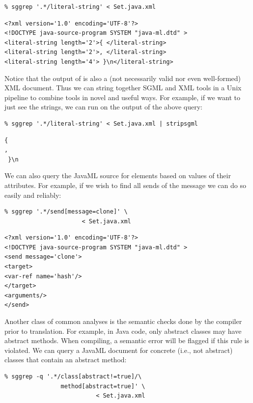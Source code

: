 \documentclass{article}
\begin{document}
{\bfseries
\begin{verbatim}
% sggrep '.*/literal-string' < Set.java.xml
\end{verbatim}
}
{\small
\begin{verbatim}
<?xml version='1.0' encoding='UTF-8'?>
<!DOCTYPE java-source-program SYSTEM "java-ml.dtd" >
<literal-string length='2'>{ </literal-string>
<literal-string length='2'>, </literal-string>
<literal-string length='4'> }\n</literal-string>
\end{verbatim}
}

\noindent Notice that the output of  is also a (not necessarily
valid nor even well-formed) XML document.  Thus we can string together
SGML and XML tools in a Unix pipeline to combine tools in novel and
useful ways.  For example, if we want to just see the strings, we can
run  on the output of the above query:

{\small
\begin{verbatim}
% sggrep '.*/literal-string' < Set.java.xml | stripsgml
\end{verbatim}
\begin{verbatim}
{ 
, 
 }\n
\end{verbatim}
}
We can also query the JavaML source for elements based on values of
their attributes.  For example, if we wish to find all sends of the
message  we can do so easily and reliably:

{\bfseries
\begin{verbatim}
% sggrep '.*/send[message=clone]' \
                      < Set.java.xml 
\end{verbatim}
}

{\small
\begin{verbatim}
<?xml version='1.0' encoding='UTF-8'?>
<!DOCTYPE java-source-program SYSTEM "java-ml.dtd" >
<send message='clone'>
<target>
<var-ref name='hash'/>
</target>
<arguments/>
</send>
\end{verbatim}
}

Another class of common analyses is the semantic checks done by the
compiler prior to translation.  For example, in Java code, only abstract
classes may have abstract methods.  When compiling, a semantic error
will be flagged if this rule is violated.  We can query a JavaML document
for concrete (i.e., not abstract) classes that contain an abstract method:

{\small
\begin{verbatim}
% sggrep -q '.*/class[abstract!=true]/\
                method[abstract=true]' \
                          < Set.java.xml
\end{verbatim}
}
\end{document}
